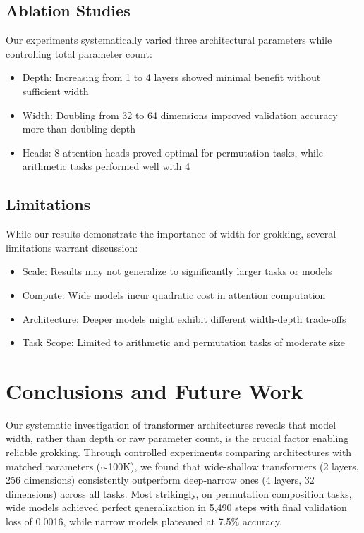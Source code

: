 \documentclass{article} %
\begin{document}
\subsection{Ablation Studies}
Our experiments systematically varied three architectural parameters while controlling total parameter count:
\begin{itemize}
    \item Depth: Increasing from 1 to 4 layers showed minimal benefit without sufficient width
    \item Width: Doubling from 32 to 64 dimensions improved validation accuracy more than doubling depth
    \item Heads: 8 attention heads proved optimal for permutation tasks, while arithmetic tasks performed well with 4
\end{itemize}

\subsection{Limitations}
While our results demonstrate the importance of width for grokking, several limitations warrant discussion:
\begin{itemize}
    \item Scale: Results may not generalize to significantly larger tasks or models
    \item Compute: Wide models incur quadratic cost in attention computation
    \item Architecture: Deeper models might exhibit different width-depth trade-offs
    \item Task Scope: Limited to arithmetic and permutation tasks of moderate size
\end{itemize}


\section{Conclusions and Future Work}
\label{sec:conclusion}

Our systematic investigation of transformer architectures reveals that model width, rather than depth or raw parameter count, is the crucial factor enabling reliable grokking. Through controlled experiments comparing architectures with matched parameters ($\sim$100K), we found that wide-shallow transformers (2 layers, 256 dimensions) consistently outperform deep-narrow ones (4 layers, 32 dimensions) across all tasks. Most strikingly, on permutation composition tasks, wide models achieved perfect generalization in 5,490 steps with final validation loss of 0.0016, while narrow models plateaued at 7.5\% accuracy.
\end{document}
